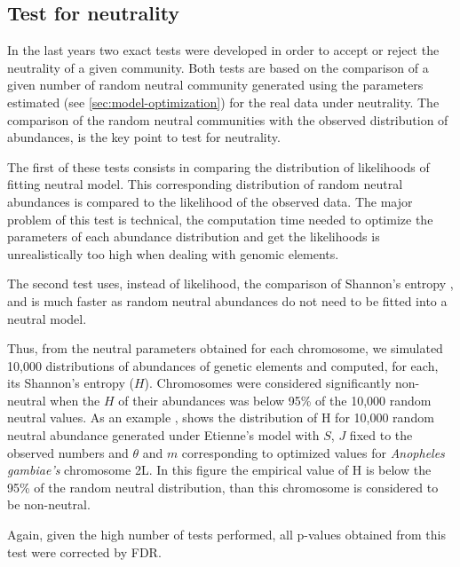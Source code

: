 \subsection{Test for neutrality}

In the last years two exact tests were developed in order to accept or reject the neutrality of a given community. Both tests are based on the comparison of a given number of random neutral community generated using the parameters estimated (see \ref{sec:model-optimization}) for the real data under neutrality. The comparison of the random neutral communities with the observed distribution of abundances, is the key point to test for neutrality.

The first of these tests \cite{Etienne2007} consists in comparing the distribution of likelihoods of fitting neutral model. This corresponding distribution of random neutral abundances is compared to the likelihood of the observed data. The major problem of this test is technical, the computation time needed to optimize the parameters of each abundance distribution and get the likelihoods is unrealistically too high when dealing with genomic elements.

The second test \cite{Jabot2011} uses, instead of likelihood, the comparison of Shannon's entropy \cite{Shannon1948}, and is much faster as random neutral abundances do not need to be fitted into a neutral model.

Thus, from the neutral parameters obtained for each chromosome, we simulated 10,000 distributions of abundances of genetic elements and computed, for each,  its Shannon's entropy ($H$). Chromosomes were considered significantly non-neutral when the $H$ of their abundances was below 95\% of the 10,000 random neutral values. As an example , shows the distribution of H for 10,000 random neutral abundance generated under Etienne's model with $S$, $J$ fixed to the observed numbers and $\theta$ and $m$ corresponding to optimized values for \textit{Anopheles gambiae's} chromosome 2L. In this figure the empirical value of H is below the 95\% of the random neutral distribution, than this chromosome is considered to be non-neutral.

Again, given the high number of tests performed, all p-values obtained from this test were corrected by FDR.

